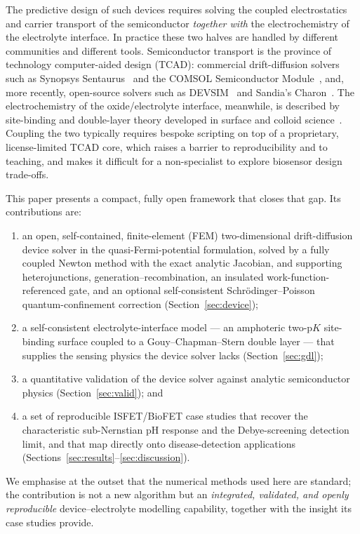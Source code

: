 \documentclass[10pt,journal]{IEEEtran}
\begin{document}
The predictive design of such devices requires solving the coupled electrostatics
and carrier transport of the semiconductor \emph{together with} the
electrochemistry of the electrolyte interface. In practice these two halves are
handled by different communities and different tools. Semiconductor transport is
the province of technology computer-aided design (TCAD): commercial drift-diffusion
solvers such as Synopsys Sentaurus~\cite{sentaurus} and the COMSOL Semiconductor
Module~\cite{comsol}, and, more recently, open-source solvers such as
DEVSIM~\cite{sanchez2016} and Sandia's Charon~\cite{charon2020}. The
electrochemistry of the oxide/electrolyte interface, meanwhile, is described by
site-binding and double-layer theory developed in surface and colloid
science~\cite{yates1974,fung1986,vanhal1996}. Coupling the two typically requires
bespoke scripting on top of a proprietary, license-limited TCAD core, which
raises a barrier to reproducibility and to teaching, and makes it difficult for a
non-specialist to explore biosensor design trade-offs.

This paper presents a compact, fully open framework that closes that gap. Its
contributions are:
\begin{enumerate}
  \item an open, self-contained, finite-element (FEM) two-dimensional
  drift-diffusion device solver in the quasi-Fermi-potential formulation, solved
  by a fully coupled Newton method with the exact analytic Jacobian, and
  supporting heterojunctions, generation--recombination, an insulated
  work-function-referenced gate, and an optional self-consistent
  Schr\"odinger--Poisson quantum-confinement correction (Section~\ref{sec:device});
  \item a self-consistent electrolyte-interface model --- an amphoteric two-p$K$
  site-binding surface coupled to a Gouy--Chapman--Stern double layer --- that
  supplies the sensing physics the device solver lacks (Section~\ref{sec:gdl});
  \item a quantitative validation of the device solver against analytic
  semiconductor physics (Section~\ref{sec:valid}); and
  \item a set of reproducible ISFET/BioFET case studies that recover the
  characteristic sub-Nernstian pH response and the Debye-screening detection
  limit, and that map directly onto disease-detection applications
  (Sections~\ref{sec:results}--\ref{sec:discussion}).
\end{enumerate}
We emphasise at the outset that the numerical methods used here are standard; the
contribution is not a new algorithm but an \emph{integrated, validated, and
openly reproducible} device--electrolyte modelling capability, together with the
insight its case studies provide.
\end{document}
